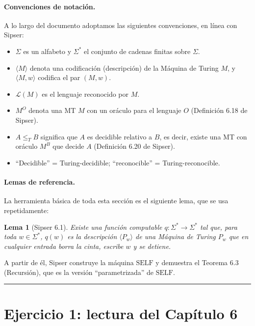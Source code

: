 \documentclass[11pt,a4paper]{article}
\theoremstyle{plain}
\newtheorem{lema}[teorema]{Lema}
\theoremstyle{definition}
\theoremstyle{remark}
\newcommand{\enc}[1]{\langle #1\rangle}
\newcommand{\encMw}{\langle M, w\rangle}
\newcommand{\lang}{\mathcal{L}}
\newcommand{\Sstar}{\Sigma^{*}}
\newcommand{\redT}{\le_{T}}
\newcommand{\SELF}{\mathrm{SELF}}
\newcommand{\Pw}[1]{P_{#1}}
\begin{document}
\paragraph{Convenciones de notaci\'on.}
A lo largo del documento adoptamos las siguientes convenciones, en l\'inea
con Sipser:
\begin{itemize}
  \item $\Sigma$ es un alfabeto y $\Sstar$ el conjunto de cadenas finitas
        sobre $\Sigma$.
  \item $\enc{M}$ denota una codificaci\'on (descripci\'on) de la M\'aquina
        de Turing $M$, y $\encMw$ codifica el par $(M,w)$.
  \item $\lang(M)$ es el lenguaje reconocido por $M$.
  \item $M^{O}$ denota una MT $M$ con un or\'aculo para el lenguaje $O$
        (Definici\'on 6.18 de Sipser).
  \item $A\redT B$ significa que $A$ es decidible relativo a $B$, es decir,
        existe una MT con or\'aculo $M^{B}$ que decide $A$
        (Definici\'on 6.20 de Sipser).
  \item ``Decidible'' = Turing-decidible; ``reconocible'' = Turing-reconocible.
\end{itemize}

\paragraph{Lemas de referencia.}
La herramienta b\'asica de toda esta secci\'on es el siguiente lema, que se usa
repetidamente:

\begin{lema}[Sipser 6.1]
\label{lem:q}
Existe una funci\'on computable $q:\Sstar\to\Sstar$ tal que, para toda
$w\in\Sstar$, $q(w)$ es la descripci\'on $\enc{\Pw{w}}$ de una M\'aquina de
Turing $\Pw{w}$ que en cualquier entrada borra la cinta, escribe $w$ y se
detiene.
\end{lema}

A partir de \'el, Sipser construye la m\'aquina $\SELF$ y demuestra el
Teorema 6.3 (Recursi\'on), que es la versi\'on ``parametrizada'' de
$\SELF$.

\bigskip\hrule\bigskip

\section{Ejercicio 1: lectura del Cap\'itulo 6}
\label{sec:ej1}
\end{document}

